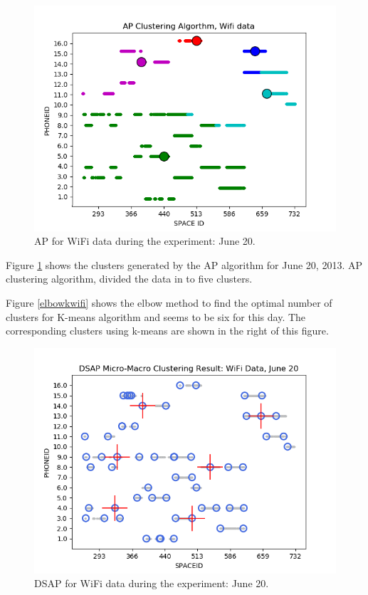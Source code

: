 \begin{figure}[!h]
    \centering
    \includegraphics[width = 10 cm]{image/Chapters/Chapter6/APJune20.png}
    \caption{ AP for WiFi data during the experiment: June 20.}
    \label{APUjoneday}
\end{figure}


Figure \ref{APUjoneday} shows the clusters generated by the AP algorithm for June 20, 2013. AP clustering algorithm, divided the data in to five clusters.


Figure \ref{elbowkwifi} shows the elbow method to find the optimal number of clusters for K-means algorithm and seems to be six for this day. The corresponding clusters using k-means are shown in the right of this figure. %









\begin{figure}[!h]
    \centering
    \includegraphics[width = 7 cm]{image/Chapters/Chapter6/DSAPJune20.png}\hfill
    \caption{ DSAP  for WiFi data during the experiment: June 20.}
    \label{3}
\end{figure}



